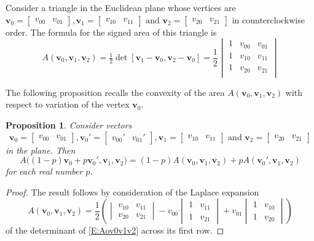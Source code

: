 \documentclass[12pt]{amsart}
\theoremstyle{plain}
\newtheorem{proposition}[theorem]{Proposition}
\theoremstyle{definition}
\numberwithin{equation}{section}
\begin{document}
Consider a triangle in the Euclidean plane whose vertices are
$
\mathbf v_0=
\begin{bmatrix}
v_{00} &v_{01}
\end{bmatrix},
\mathbf v_1=
\begin{bmatrix}
v_{10} &v_{11}
\end{bmatrix}
\mbox{ and }
\mathbf v_2=
\begin{bmatrix}
v_{20} &v_{21}
\end{bmatrix}
$
in counterclockwise order. The formula for the signed area of this triangle is
\begin{equation}\label{E:Aov0v1v2}
A\left(\mathbf v_0,\mathbf v_1,\mathbf v_2\right)
=
\tfrac12\det[
\mathbf v_1-\mathbf v_0,
\mathbf v_2-\mathbf v_0
]
=
\frac12
\begin{vmatrix}
1 &v_{00} &v_{01}\\
1 &v_{10} &v_{11}\\
1 &v_{20} &v_{21}\\
\end{vmatrix}
\end{equation}

The following proposition recalls the convexity of the area $A\left(\mathbf v_0,\mathbf v_1,\mathbf v_2\right)$ with respect to variation of the vertex $\mathbf v_0$.


\begin{proposition}\label{P:Aov0v1v2}
Consider vectors
$$
\mathbf v_0=
\begin{bmatrix}
v_{00} &v_{01}
\end{bmatrix},
\mathbf v_0'=
\begin{bmatrix}
v_{00}' &v_{01}'
\end{bmatrix},
\mathbf v_1=
\begin{bmatrix}
v_{10} &v_{11}
\end{bmatrix}
\mbox{ and }
\mathbf v_2=
\begin{bmatrix}
v_{20} &v_{21}
\end{bmatrix}
$$
in the plane. Then
$$
A\big((1-p)\mathbf v_0+p\mathbf v_0',\mathbf v_1,\mathbf v_2\big)
=
(1-p)
A\left(\mathbf v_0,\mathbf v_1,\mathbf v_2\right)
+
p
A\left(\mathbf v_0',\mathbf v_1,\mathbf v_2\right)
$$
for each real number $p$.
\end{proposition}


\begin{proof}
The result follows by consideration of the Laplace expansion
$$
A\left(\mathbf v_0,\mathbf v_1,\mathbf v_2\right)=
\frac12
\left(
\begin{vmatrix}
v_{10} &v_{11}\\
v_{20} &v_{21}
\end{vmatrix}
-v_{00}
\begin{vmatrix}
1 &v_{11}\\
1 &v_{21}
\end{vmatrix}
+v_{01}
\begin{vmatrix}
1 &v_{10}\\
1 &v_{20}
\end{vmatrix}
\right)
$$
of the determinant of \eqref{E:Aov0v1v2} across its first row.
\end{proof}
\end{document}
